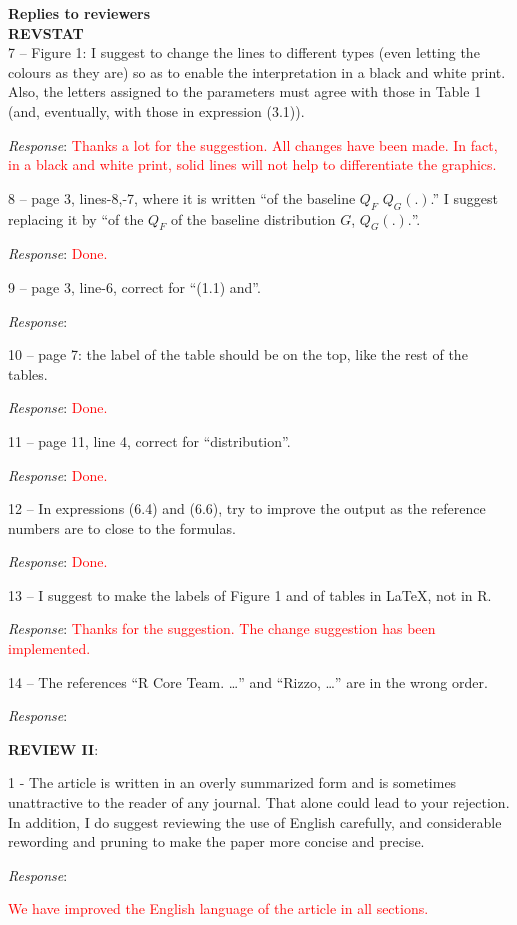 \documentclass[version=last,12pt,{"maintainersDelight"}]{scrlttr2}
\begin{document}
\begin{letter}{\textbf{Replies to reviewers}\\\textbf{REVSTAT}\\}
7 -- Figure 1: I suggest to change the lines to different types (even letting the colours as they are) so as to enable the interpretation in a black and white print. Also, the letters assigned to the parameters must agree with those in Table 1 (and, eventually, with those in expression (3.1)).

\emph{Response}:
\textcolor{red}{Thanks a lot for the suggestion. All changes have been made. In fact, in a black and white print, solid lines will not help to differentiate the graphics.}

8 -- page 3, lines-8,-7, where it is written ``of the baseline \(Q_F\) \(Q_G(.)\).'' I suggest replacing it by ``of the \(Q_F\) of the baseline distribution \(G\), \(Q_G(.).\)''.

\emph{Response}: \textcolor{red}{Done.}

9 -- page 3, line-6, correct for ``(1.1) and''.

\emph{Response}:

10 -- page 7: the label of the table should be on the top, like the rest of the tables.

\emph{Response}: \textcolor{red}{Done.}

11 -- page 11, line 4, correct for ``distribution''.

\emph{Response}: \textcolor{red}{Done.}

12 -- In expressions (6.4) and (6.6), try to improve the output as the reference numbers are to close to the formulas.

\emph{Response}: \textcolor{red}{Done.}

13 -- I suggest to make the labels of Figure 1 and of tables in \LaTeX, not in R.

\emph{Response}:
\textcolor{red}{Thanks for the suggestion. The change suggestion has been implemented.}

14 -- The references ``R Core Team. \ldots{}'' and ``Rizzo, \ldots{}'' are in the wrong order.

\emph{Response}:

\textbf{REVIEW II}:

1 - The article is written in an overly summarized form and is sometimes unattractive to the reader of any journal. That alone could lead to your rejection. In addition, I do suggest reviewing the use of English carefully, and considerable rewording and pruning to make the paper more concise and precise.

\emph{Response}:

\textcolor{red}{We have improved the English language of the article in all sections.}


\end{letter}
\end{document}
